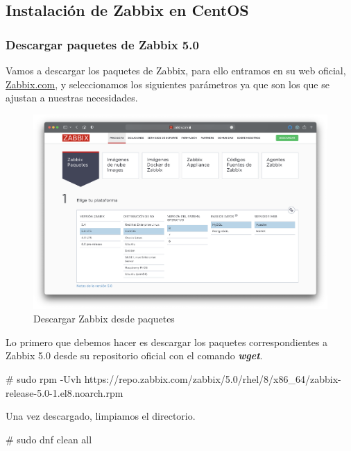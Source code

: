 \newpage
\subsection{Instalación de Zabbix en CentOS}
    \subsubsection{Descargar paquetes de Zabbix 5.0}
    Vamos a descargar los paquetes de Zabbix, para ello entramos en su web oficial, \href{https://www.zabbix.com/download}{Zabbix.com}, y 
    seleccionamos los siguientes parámetros ya que son los que se ajustan a nuestras necesidades.
    \begin{figure}[H]
        \centering
        \includegraphics[scale=0.3]{images/zabbix_centOS.png}
        \caption{Descargar Zabbix desde paquetes}
        \label{fig:zabbix_centOS}
    \end{figure}

    Lo primero que debemos hacer es descargar los paquetes correspondientes a Zabbix 5.0 desde su repositorio oficial con el comando \textbf{\emph{wget}}. 
        \begin{tcolorbox}[colback=black!10, halign=left]
            \# sudo rpm -Uvh https://repo.zabbix.com/zabbix/5.0/rhel/8/x86\_64/zabbix-release-5.0-1.el8.noarch.rpm
        \end{tcolorbox}

    Una vez descargado, limpiamos el directorio.
        \begin{tcolorbox}[colback=black!10, halign=left]
            \# sudo dnf clean all
        \end{tcolorbox}

